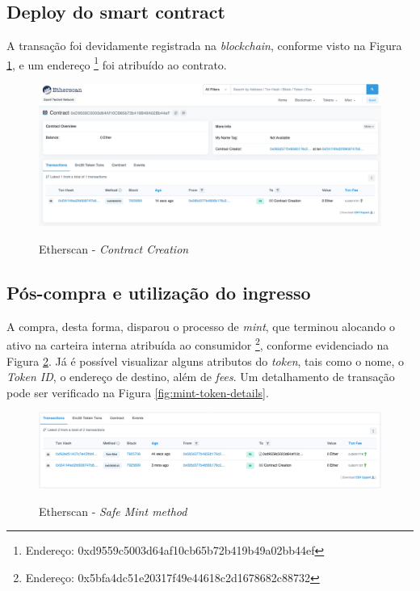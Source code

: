 {\subsection{\esp Deploy do smart contract}

A transação foi devidamente registrada na \textit{blockchain}, conforme visto na Figura \ref{fig:deploy-smartcontract}, e um endereço \footnote{Endereço: 0xd9559c5003d64af10cb65b72b419b49a02bb44ef} foi atribuído ao contrato.

\begin{figure}[ht]
    \centering
    \caption{Etherscan - \textit{Contract Creation}}
    \includegraphics[scale=0.35]{figuras/deploy-smartcontract.png}
    \label{fig:deploy-smartcontract}
\end{figure}

\subsection{\esp Pós-compra e utilização do ingresso} \label{ticket-utilization}

A compra, desta forma, disparou o processo de \textit{mint}, que terminou alocando o ativo na carteira interna atribuída ao consumidor \footnote{Endereço: 0x5bfa4dc51e20317f49e44618c2d1678682c88732}, conforme evidenciado na Figura \ref{fig:mint-token}. Já é possível visualizar alguns atributos do \textit{token}, tais como o nome, o \textit{Token ID}, o endereço de destino, além de \textit{fees}. Um detalhamento de transação pode ser verificado na Figura \ref{fig:mint-token-details}.

\begin{figure}[ht]
    \centering
    \caption{Etherscan - \textit{Safe Mint method}}
    \includegraphics[scale=0.3]{figuras/mint-token.png}
    \label{fig:mint-token}
\end{figure}

}
